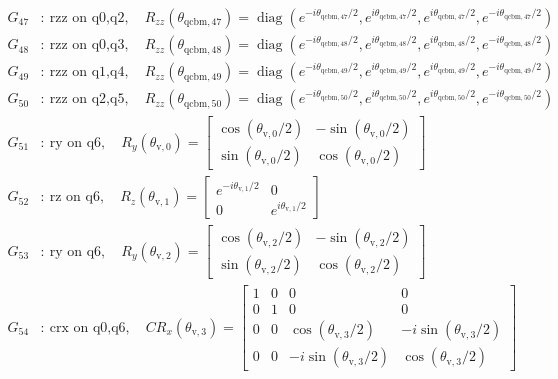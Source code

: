\begin{align*}
G_{47}&:\ \text{rzz on q0,q2},\quad R_{zz}(\theta_{\mathrm{qcbm},47})=\operatorname{diag}(e^{-i\theta_{\mathrm{qcbm},47}/2},e^{i\theta_{\mathrm{qcbm},47}/2},e^{i\theta_{\mathrm{qcbm},47}/2},e^{-i\theta_{\mathrm{qcbm},47}/2})\\
G_{48}&:\ \text{rzz on q0,q3},\quad R_{zz}(\theta_{\mathrm{qcbm},48})=\operatorname{diag}(e^{-i\theta_{\mathrm{qcbm},48}/2},e^{i\theta_{\mathrm{qcbm},48}/2},e^{i\theta_{\mathrm{qcbm},48}/2},e^{-i\theta_{\mathrm{qcbm},48}/2})\\
G_{49}&:\ \text{rzz on q1,q4},\quad R_{zz}(\theta_{\mathrm{qcbm},49})=\operatorname{diag}(e^{-i\theta_{\mathrm{qcbm},49}/2},e^{i\theta_{\mathrm{qcbm},49}/2},e^{i\theta_{\mathrm{qcbm},49}/2},e^{-i\theta_{\mathrm{qcbm},49}/2})\\
G_{50}&:\ \text{rzz on q2,q5},\quad R_{zz}(\theta_{\mathrm{qcbm},50})=\operatorname{diag}(e^{-i\theta_{\mathrm{qcbm},50}/2},e^{i\theta_{\mathrm{qcbm},50}/2},e^{i\theta_{\mathrm{qcbm},50}/2},e^{-i\theta_{\mathrm{qcbm},50}/2})\\
G_{51}&:\ \text{ry on q6},\quad R_y(\theta_{\mathrm{v},0})=\begin{bmatrix}\cos(\theta_{\mathrm{v},0}/2)&-\sin(\theta_{\mathrm{v},0}/2)\\\sin(\theta_{\mathrm{v},0}/2)&\cos(\theta_{\mathrm{v},0}/2)\end{bmatrix}\\
G_{52}&:\ \text{rz on q6},\quad R_z(\theta_{\mathrm{v},1})=\begin{bmatrix}e^{-i\theta_{\mathrm{v},1}/2}&0\\0&e^{i\theta_{\mathrm{v},1}/2}\end{bmatrix}\\
G_{53}&:\ \text{ry on q6},\quad R_y(\theta_{\mathrm{v},2})=\begin{bmatrix}\cos(\theta_{\mathrm{v},2}/2)&-\sin(\theta_{\mathrm{v},2}/2)\\\sin(\theta_{\mathrm{v},2}/2)&\cos(\theta_{\mathrm{v},2}/2)\end{bmatrix}\\
G_{54}&:\ \text{crx on q0,q6},\quad CR_x(\theta_{\mathrm{v},3})=\begin{bmatrix}1&0&0&0\\0&1&0&0\\0&0&\cos(\theta_{\mathrm{v},3}/2)&-i\sin(\theta_{\mathrm{v},3}/2)\\0&0&-i\sin(\theta_{\mathrm{v},3}/2)&\cos(\theta_{\mathrm{v},3}/2)\end{bmatrix}\\

\end{align*}
